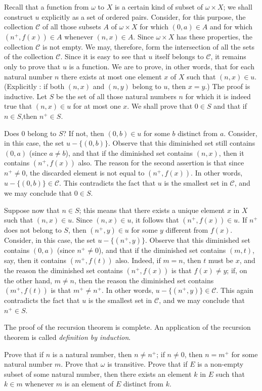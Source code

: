 \subtitle{Proof} Recall that a function from $\omega$ to $X$ is a certain kind of subset of $ \omega \times X$; we shall construct $u$ explicitly as a set of ordered  pairs. Consider, for this purpose, the collection $\mathcal{C}$ of all those subsets $A$ of $\omega \times X$ for which $(0, a) \in A$ and for which $(n^{+}, f(x)) \in A$ whenever $(n, x) \in A$. Since $ \omega \times X$ has these properties, the collection $\mathcal{C}$ is not empty. We may, therefore, form the intersection of all the sets of the collection $\mathcal{C}$. Since it is easy to see that $u$ itself belongs to $\mathcal{C}$, it remains only to prove that $u$ is a function. We are to prove, in other words, that for each natural number $n$ there exists at most one element $x$ of $X$ such that $(n, x) \in u$. (Explicitly : if both $(n, x)$ and $(n, y)$ belong to $u$, then $x = y$.) The proof is inductive. Let $S$ be the set of all those natural numbers $n$ for which it is indeed true that $(n, x) \in u$ for at most one $x$. We shall prove that $0 \in S$ and that if $n \in S$,then $n^{+} \in S$.

Does $0$ belong to $S$? If not, then $(0,b) \in u$ for some $b$ distinct from $a$. Consider, in this case, the set $u - \{ (0, b) \}$. Observe that this diminished set still contains $(0, a)$ (since $a \neq b$), and that if the diminished set contains $(n, x)$, then it contains $(n^{+}, f(x))$ also. The reason for the second assertion is that since $n^{+} \neq 0$, the discarded element is not equal to $(n^{+}, f(x))$. In other words, $u - \{ (0, b) \} \in \mathcal{C}$. This contradicts the fact that $u$ is the smallest set in $\mathcal{C}$, and we may conclude that $0 \in S$. 

Suppose now that $n \in S$; this means that there exists a unique element $x$ in $X$ such that $(n, x) \in u$. Since $(n, x) \in u$, it follows that $(n^{+}, f(x)) \in u$. If $n^{+}$ does not belong to $S$, then $(n^{+}, y) \in u$ for some $y$ different from $f(x)$. Consider, in this case, the set $u - \{ (n^{+}, y) \}$. Observe that this diminished set contains $(0, a)$ (since $n^{+} \neq 0$), and that if the diminished set contains $(m, t)$, say, then it contains $(m^{+}, f(t))$ also. Indeed, if $m = n$, then $t$ must be $x$, and the reason the diminished set contains $(n^{+}, f(x))$ is that $f(x) \neq y$; if, on the other hand, $m \neq n$, then the reason the diminished set contains $(m^{+}, f(t))$ is that $m^{+} \neq n^{+}$. In other words, $u - \{ ( n^{+}, y) \} \in \mathcal{C}$. This again contradicts the fact that $u$ is the smallest set in $\mathcal{C}$, and we may conclude that $n^{+} \in S$. 

The proof of the recursion theorem is complete. An application of the recursion theorem is called \textit{definition by induction}. 

\begin{exercise} Prove that if $n$ is a natural number, then $n \neq n^{+}$; if $n \neq 0$, then $n = m^{+}$ for some natural number $m$. Prove that $ \omega $ is transitive. Prove that if $E$ is a non-empty subset of some natural number, then there exists an element $k$ in $E$ such that $k \in m$ whenever $m$ is an element of $E$ distinct from $k$.
\end{exercise}